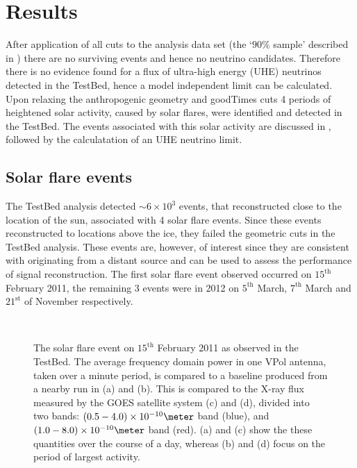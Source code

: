 \chapter{Results}
\label{chap:Results}

After application of all cuts to the analysis data set (the `$90 \%$ sample' described in ) there are no surviving events and hence no neutrino candidates. Therefore there is no evidence found for a flux of ultra-high energy (UHE) neutrinos detected in the TestBed, hence a model independent limit can be calculated. Upon relaxing the anthropogenic geometry and goodTimes cuts 4 periods of heightened solar activity, caused by solar flares, were identified and detected in the TestBed. The events associated with this solar activity are discussed in , followed by the calculatation of an UHE neutrino limit.


\section{Solar flare events}
\label{sec:Results:Solar-Flare}

The TestBed analysis detected $\sim 6 \times 10^{3}$ events, that reconstructed close to the location of the sun, associated with 4 solar flare events. Since these events reconstructed to locations above the ice, they failed the geometric cuts in the TestBed analysis. These events are, however, of interest since they are consistent with originating from a distant source and can be used to assess the performance of signal reconstruction. The first solar flare event observed occurred on $15^{\mbox{th}}$ February 2011, the remaining 3 events were in 2012 on $5^{\mbox{th}}$ March, $7^{\mbox{th}}$ March and $21^{\mbox{st}}$ of November respectively.



\begin{figure} [htpb]
  \hfill
  \\
  \hfill
  \caption{The solar flare event on $15^{\mbox{th}}$ February 2011 as observed in the TestBed. The average frequency domain power in one VPol antenna, taken over a minute period, is compared to a baseline produced from a nearby run in (a) and (b). This is compared to the X-ray flux measured by the GOES satellite system \cite{2009SPIE.7438E...1C} (c) and (d), divided into two bands: $(0.5 - 4.0) \times 10^{-10} \meter$ band (blue), and $(1.0 - 8.0) \times 10^{-10} \meter$ band (red). (a) and (c) show the these quantities over the course of a day, whereas (b) and (d) focus on the period of largest activity.}  
  \label{fig:Results:Solar-Flare:Frequency}
\end{figure}

